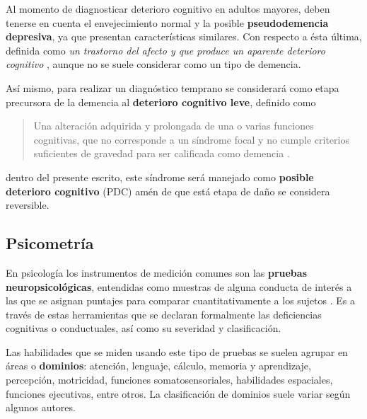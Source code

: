 Al momento de diagnosticar deterioro cognitivo en adultos mayores, deben tenerse en cuenta el 
envejecimiento normal y la posible \textbf{pseudodemencia depresiva}, ya que presentan 
características similares. 
%
Con respecto a ésta última, definida como \textit{un trastorno del afecto y que produce un aparente 
deterioro cognitivo} \cite{DCM5}, aunque no se suele considerar como un tipo de demencia.

Así mismo, para realizar un diagnóstico temprano se considerará como etapa precursora de la 
demencia al \textbf{deterioro cognitivo leve}, definido como 
\begin{quote}
Una alteración adquirida y prolongada de una o varias funciones cognitivas, que no corresponde a un 
síndrome focal y no cumple criterios suficientes de gravedad para ser calificada como demencia
\cite{Robles02}.
\end{quote}
dentro del presente escrito, este síndrome será manejado como \textbf{posible deterioro cognitivo} 
(PDC) amén de que está etapa de daño se considera reversible.


\subsection{Psicometría}

En psicología los instrumentos de medición comunes son las \textbf{pruebas neuropsicológicas}, 
entendidas como muestras de alguna conducta de interés a las que se asignan puntajes para comparar 
cuantitativamente a los sujetos \cite{Ardila12}.
%
Es a través de estas herramientas que se declaran formalmente las deficiencias cognitivas o 
conductuales, así como su severidad y clasificación.

Las habilidades que se miden usando este tipo de pruebas se suelen agrupar en áreas o 
\textbf{dominios}: atención, lenguaje, cálculo, memoria y aprendizaje, percepción, motricidad, 
funciones somatosensoriales, habilidades espaciales, funciones ejecutivas, entre otros. 
%
La clasificación de dominios suele variar según algunos autores.

